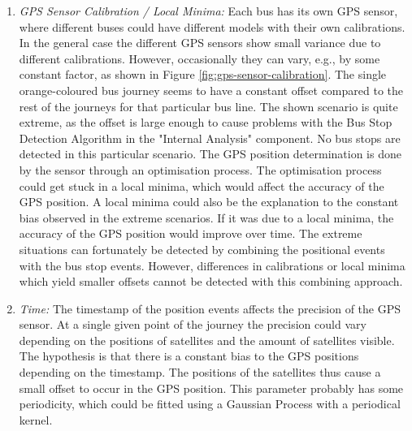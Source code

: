 \begin{enumerate}
    \item \textit{GPS Sensor Calibration / Local Minima:}
    Each bus has its own GPS sensor, where different buses could have different models with their own calibrations.
    In the general case the different GPS sensors show small variance due to different calibrations.
    However, occasionally they can vary, e.g., by some constant factor, as shown in Figure \ref{fig:gps-sensor-calibration}.
    The single orange-coloured bus journey seems to have a constant offset compared to the rest of the journeys for that particular bus line.
    The shown scenario is quite extreme, as the offset is large enough to cause problems with the Bus Stop Detection Algorithm in the "Internal Analysis" component.
    No bus stops are detected in this particular scenario.
    The GPS position determination is done by the sensor through an optimisation process.
    The optimisation process could get stuck in a local minima, which would affect the accuracy of the GPS position.
    A local minima could also be the explanation to the constant bias observed in the extreme scenarios.
    If it was due to a local minima, the accuracy of the GPS position would improve over time.
    The extreme situations can fortunately be detected by combining the positional events with the bus stop events.
    However, differences in calibrations or local minima which yield smaller offsets cannot be detected with this combining approach.


    \item \textit{Time:}
    The timestamp of the position events affects the precision of the GPS sensor.
    At a single given point of the journey the precision could vary depending on the positions of satellites and the amount of satellites visible.
    The hypothesis is that there is a constant bias to the GPS positions depending on the timestamp.
    The positions of the satellites thus cause a small offset to occur in the GPS position.
    This parameter probably has some periodicity, which could be fitted using a Gaussian Process with a periodical kernel.
    
\end{enumerate} 


